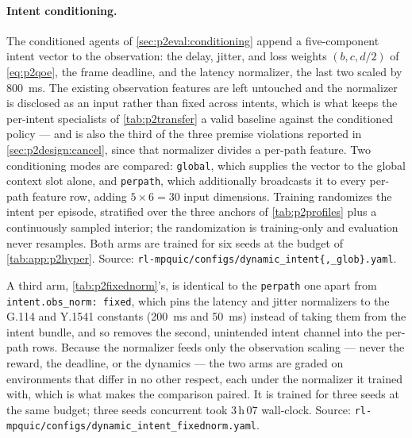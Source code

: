 \paragraph{Intent conditioning.} The conditioned agents of \cref{sec:p2eval:conditioning} append a
five-component intent vector to the observation: the delay, jitter, and loss weights $(b, c, d/2)$ of
\cref{eq:p2qoe}, the frame deadline, and the latency normalizer, the last two scaled by
\SI{800}{\milli\second}. The existing observation features are left untouched and the normalizer is
disclosed as an input rather than fixed across intents, which is what keeps the per-intent specialists
of \cref{tab:p2transfer} a valid baseline against the conditioned policy --- and is also the third of
the three premise violations reported in \cref{sec:p2design:cancel}, since that normalizer divides a
per-path feature. Two conditioning modes are compared: \texttt{global}, which supplies the vector to the
global context slot alone, and \texttt{perpath}, which additionally broadcasts it to every per-path
feature row, adding $5 \times 6 = 30$ input dimensions. Training randomizes the intent per episode,
stratified over the three anchors of \cref{tab:p2profiles} plus a continuously sampled interior; the
randomization is training-only and evaluation never resamples. Both arms are trained for six seeds at the
budget of \cref{tab:app:p2hyper}. Source: \texttt{rl-mpquic/configs/dynamic\_intent\{,\_glob\}.yaml}.

A third arm, \cref{tab:p2fixednorm}'s, is identical to the \texttt{perpath} one apart from
\texttt{intent.obs\_norm: fixed}, which pins the latency and jitter normalizers to the G.114 and Y.1541
constants (\SI{200}{\milli\second} and \SI{50}{\milli\second}) instead of taking them from the intent
bundle, and so removes the second, unintended intent channel into the per-path rows. Because the
normalizer feeds only the observation scaling --- never the reward, the deadline, or the dynamics ---
the two arms are graded on environments that differ in no other respect, each under the normalizer it
trained with, which is what makes the comparison paired. It is trained for three seeds at the same
budget; three seeds concurrent took 3\,h\,07 wall-clock. Source:
\texttt{rl-mpquic/configs/dynamic\_intent\_fixednorm.yaml}.

